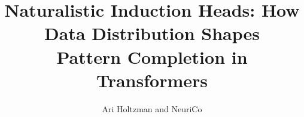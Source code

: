 \documentclass{article}
\title{Naturalistic Induction Heads: How Data Distribution Shapes\\Pattern Completion in Transformers}
\author{Ari Holtzman and NeuriCo}
\begin{document}
\maketitle

\begin{abstract}

\end{abstract}










\end{document}
